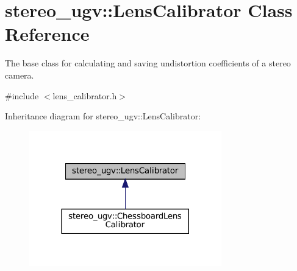 \hypertarget{classstereo__ugv_1_1LensCalibrator}{}\section{stereo\+\_\+ugv\+:\+:Lens\+Calibrator Class Reference}
\label{classstereo__ugv_1_1LensCalibrator}


The base class for calculating and saving undistortion coefficients of a stereo camera.  




{\ttfamily \#include $<$lens\+\_\+calibrator.\+h$>$}



Inheritance diagram for stereo\+\_\+ugv\+:\+:Lens\+Calibrator\+:
\nopagebreak
\begin{figure}[H]
\begin{center}
\leavevmode
\includegraphics[width=236pt]{classstereo__ugv_1_1LensCalibrator__inherit__graph}
\end{center}
\end{figure}
